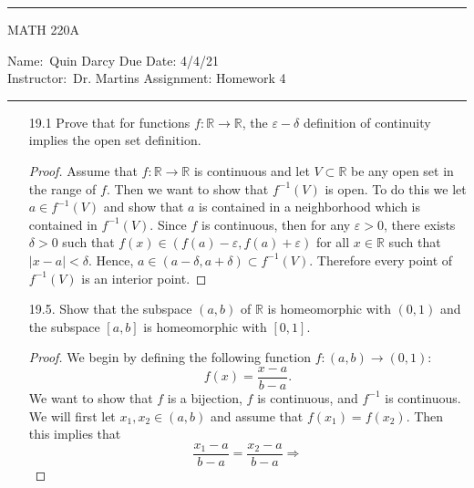 \documentclass[12pt]{article}
\theoremstyle{definition}
\newcommand{\abs}[1]{\lvert #1 \rvert}
\begin{document}
 \thispagestyle{empty}\hrule

    \begin{center}
        \vspace{.4cm} { \large MATH 220A}
    \end{center}
    {Name:\ Quin Darcy \hspace{\fill} Due Date: 4/4/21 \\
    { Instructor:}\ Dr. Martins \hspace{\fill} Assignment:
    Homework 4 \\ \hrule}

    \begin{enumerate}
        \item[19.1] Prove that for functions $f:\mathbb{R}\to\mathbb{R}$, the $\varepsilon-\delta$ definition 
        of continuity implies the open set definition.
            \begin{proof}
                Assume that $f:\mathbb{R}\to\mathbb{R}$ is continuous and let $V\subset\mathbb{R}$ 
                be any open set in the range of $f$. Then we want to show that $f^{-1}(V)$ is open.
                To do this we let $a\in f^{-1}(V)$ and show that $a$ is contained in a 
                neighborhood which is contained in $f^{-1}(V)$. Since $f$ is continuous, then 
                for any $\varepsilon>0$, there exists $\delta>0$ such that 
                $f(x)\in(f(a)-\varepsilon,f(a)+\varepsilon)$ for all $x\in\mathbb{R}$ such that 
                $\abs{x-a}<\delta$. Hence, $a\in(a-\delta, a+\delta)\subset f^{-1}(V)$. Therefore 
                every point of $f^{-1}(V)$ is an interior point.
            \end{proof}
        \item[19.5.] Show that the subspace $(a,b)$ of $\mathbb{R}$ is homeomorphic with $(0,1)$ and 
        the subspace $[a,b]$ is homeomorphic with $[0,1]$.
            \begin{proof}
                We begin by defining the following function $f:(a,b)\to(0,1)$:
                \begin{equation*}
                    f(x)=\frac{x-a}{b-a}.
                \end{equation*}
                We want to show that $f$ is a bijection, $f$ is continuous, and
                $f^{-1}$ is continuous. We will first let $x_1, x_2\in(a, b)$
                and assume that $f(x_1)=f(x_2)$. Then this implies that 
                \begin{equation*}
                    \frac{x_1-a}{b-a}=\frac{x_2-a}{b-a}\Rightarrow

\end{equation*}
\end{proof}
\end{enumerate}
\end{document}
